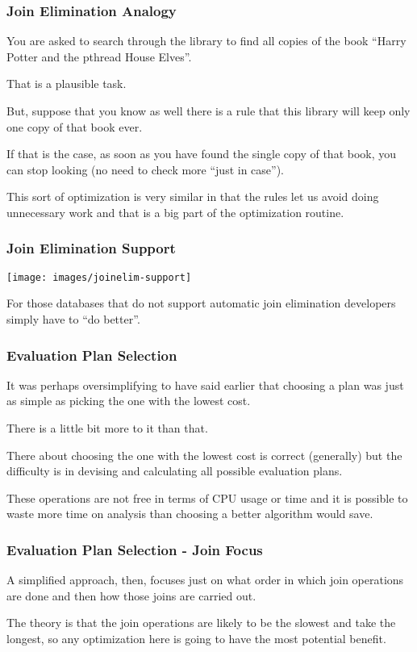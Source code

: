 \begin{frame}
\frametitle{Join Elimination Analogy}
You are asked to search through the library to find all copies of the book ``Harry Potter and the pthread House Elves''. 

That is a plausible task. 

But, suppose that you know as well there is a rule that this library will keep only one copy of that book ever. 

If that is the case, as soon as you have found the single copy of that book, you can stop looking (no need to check more ``just in case''). 

This sort of optimization is very similar in that the rules let us avoid doing unnecessary work and that is a big part of the optimization routine.

\end{frame}


\begin{frame}
\frametitle{Join Elimination Support}

\begin{center}
	\texttt{[image: images/joinelim-support]}
\end{center}

For those databases that do not support automatic join elimination developers simply have to ``do better''. 

\end{frame}


\begin{frame}
\frametitle{Evaluation Plan Selection}

It was perhaps oversimplifying to have said earlier that choosing a plan was just as simple as picking the one with the lowest cost. 

There is a little bit more to it than that.

There about choosing the one with the lowest cost is correct (generally) but the difficulty is in devising and calculating all possible evaluation plans. 

These operations are not free in terms of CPU usage or time and it is possible to waste more time on analysis than choosing a better algorithm would save. 

\end{frame}


\begin{frame}
\frametitle{Evaluation Plan Selection - Join Focus}

A simplified approach, then, focuses just on what order in which join operations are done and then how those joins are carried out. 

The theory is that the join operations are likely to be the slowest and take the longest, so any optimization here is going to have the most potential benefit.


\end{frame}

